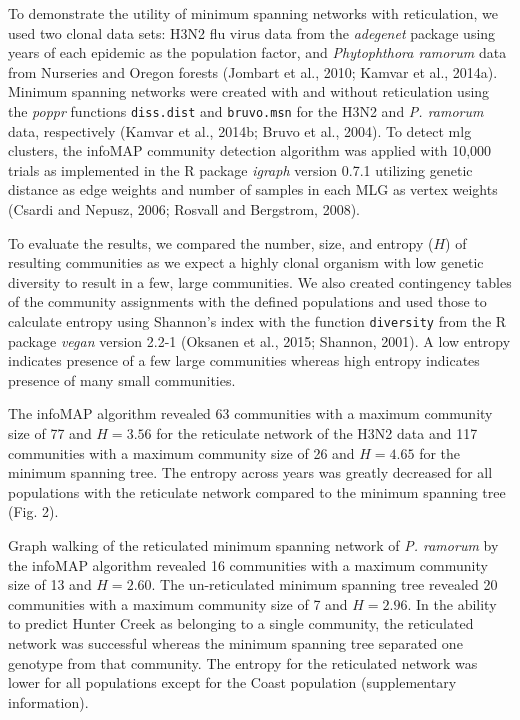 \documentclass{frontiersSCNS} %
\begin{document}
To demonstrate the utility of minimum spanning networks with
reticulation, we used two clonal data sets: H3N2 flu virus data from the
\emph{adegenet} package using years of each epidemic as the population
factor, and \emph{Phytophthora ramorum} data from Nurseries and Oregon
forests (Jombart et al., 2010; Kamvar et al., 2014a). Minimum spanning
networks were created with and without reticulation using the
\emph{poppr} functions \texttt{diss.dist} and \texttt{bruvo.msn} for the
H3N2 and \emph{P. ramorum} data, respectively (Kamvar et al., 2014b;
Bruvo et al., 2004). To detect mlg clusters, the infoMAP community
detection algorithm was applied with 10,000 trials as implemented in the
R package \emph{igraph} version 0.7.1 utilizing genetic distance as edge
weights and number of samples in each MLG as vertex weights (Csardi and
Nepusz, 2006; Rosvall and Bergstrom, 2008).

To evaluate the results, we compared the number, size, and entropy
(\(H\)) of resulting communities as we expect a highly clonal organism
with low genetic diversity to result in a few, large communities. We
also created contingency tables of the community assignments with the
defined populations and used those to calculate entropy using Shannon's
index with the function \texttt{diversity} from the R package
\emph{vegan} version 2.2-1 (Oksanen et al., 2015; Shannon, 2001). A low
entropy indicates presence of a few large communities whereas high
entropy indicates presence of many small communities.

The infoMAP algorithm revealed 63 communities with a maximum community
size of 77 and \(H = 3.56\) for the reticulate network of the H3N2 data
and 117 communities with a maximum community size of 26 and \(H = 4.65\)
for the minimum spanning tree. The entropy across years was greatly
decreased for all populations with the reticulate network compared to
the minimum spanning tree (Fig. 2).

Graph walking of the reticulated minimum spanning network of \emph{P.
ramorum} by the infoMAP algorithm revealed 16 communities with a maximum
community size of 13 and \(H = 2.60\). The un-reticulated minimum
spanning tree revealed 20 communities with a maximum community size of 7
and \(H = 2.96\). In the ability to predict Hunter Creek as belonging to
a single community, the reticulated network was successful whereas the
minimum spanning tree separated one genotype from that community. The
entropy for the reticulated network was lower for all populations except
for the Coast population (supplementary information).
\end{document}
